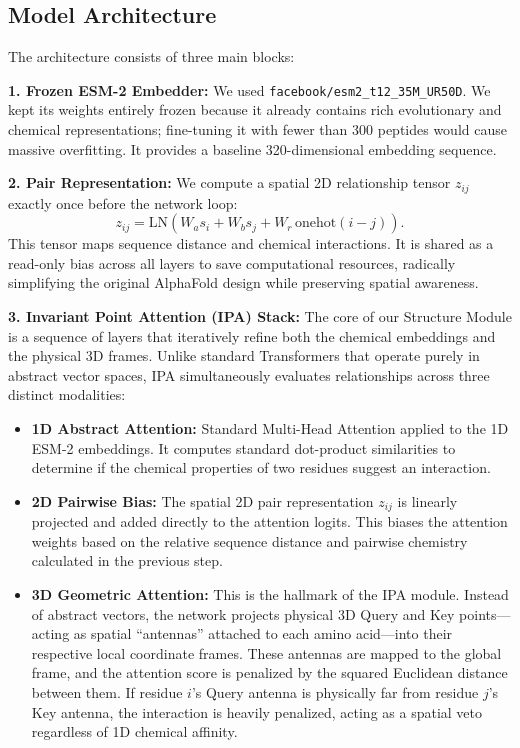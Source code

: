 \documentclass{article}
\begin{document}
\subsection{Model Architecture}

The architecture consists of three main blocks:

\textbf{1. Frozen ESM-2 Embedder:} We used \texttt{facebook/esm2\_t12\_35M\_UR50D}. We kept its weights entirely frozen because it already contains rich evolutionary and chemical representations; fine-tuning it with fewer than 300 peptides would cause massive overfitting. It provides a baseline 320-dimensional embedding sequence.

\textbf{2. Pair Representation:} We compute a spatial 2D relationship tensor $z_{ij}$ exactly once before the network loop:
\begin{equation}
z_{ij}=\mathrm{LN}\!\left(W_a s_i + W_b s_j + W_r\,\mathrm{onehot}(i-j)\right).
\end{equation}
This tensor maps sequence distance and chemical interactions. It is shared as a read-only bias across all layers to save computational resources, radically simplifying the original AlphaFold design while preserving spatial awareness.

\textbf{3. Invariant Point Attention (IPA) Stack:} The core of our Structure Module is a sequence of layers that iteratively refine both the chemical embeddings and the physical 3D frames. Unlike standard Transformers that operate purely in abstract vector spaces, IPA simultaneously evaluates relationships across three distinct modalities:
\begin{itemize}
    \item \textbf{1D Abstract Attention:} Standard Multi-Head Attention applied to the 1D ESM-2 embeddings. It computes standard dot-product similarities to determine if the chemical properties of two residues suggest an interaction.
    \item \textbf{2D Pairwise Bias:} The spatial 2D pair representation $z_{ij}$ is linearly projected and added directly to the attention logits. This biases the attention weights based on the relative sequence distance and pairwise chemistry calculated in the previous step.
    \item \textbf{3D Geometric Attention:} This is the hallmark of the IPA module. Instead of abstract vectors, the network projects physical 3D Query and Key points---acting as spatial ``antennas'' attached to each amino acid---into their respective local coordinate frames. These antennas are mapped to the global frame, and the attention score is penalized by the squared Euclidean distance between them. If residue $i$'s Query antenna is physically far from residue $j$'s Key antenna, the interaction is heavily penalized, acting as a spatial veto regardless of 1D chemical affinity.
\end{itemize}
\end{document}
